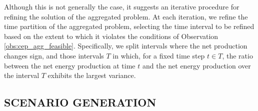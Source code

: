 {{Although this is not generally the case, it suggests an iterative procedure for refining the solution of the aggregated problem. At each iteration, we refine the time partition of the aggregated problem, selecting the time interval to be refined based on the extent to which it violates the conditions of Observation \ref{obs:cep_agg_feasible}. Specifically, we split intervals where the net production changes sign, and those intervals \(T\) in which, for a fixed time step \(t \in T\), the ratio between the net energy production at time \(t\) and the net energy production over the interval \(T\) exhibits the largest variance.

}

\subsection{SCENARIO GENERATION}

}
